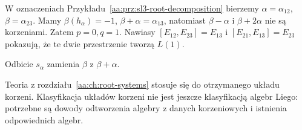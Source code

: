 \begin{przyklad}
W oznaczeniach Przykładu~\ref{aa:prz:sl3-root-decomposition} bierzemy $\alpha=\alpha_{12}$, $\beta=\alpha_{23}$. Mamy $\beta(h_\alpha)=-1$, $\beta+\alpha=\alpha_{13}$, natomiast $\beta-\alpha$ i $\beta+2\alpha$ nie są korzeniami. Zatem $p=0,q=1$. Nawiasy $[E_{12},E_{23}]=E_{13}$ i $[E_{21},E_{13}]=E_{23}$ pokazują, że te dwie przestrzenie tworzą $L(1)$.
\begin{center}
\end{center}
Odbicie $s_\alpha$ zamienia $\beta$ z $\beta+\alpha$.
\end{przyklad}

Teoria z rozdziału~\ref{aa:ch:root-systems} stosuje się do otrzymanego układu korzeni. Klasyfikacja układów korzeni nie jest jeszcze klasyfikacją algebr Liego: potrzebne są dowody odtworzenia algebry z danych korzeniowych i istnienia odpowiednich algebr.
